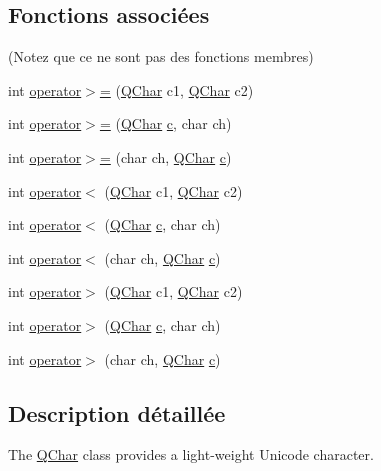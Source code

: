 \subsection*{Fonctions associées}
(Notez que ce ne sont pas des fonctions membres) \begin{DoxyCompactItemize}
\item 
int \hyperlink{class_q_char_a4b5fd192cc790217e8be92350c712f96}{operator$>$=} (\hyperlink{class_q_char}{Q\+Char} c1, \hyperlink{class_q_char}{Q\+Char} c2)
\item 
int \hyperlink{class_q_char_a76a11bfd8c91c16da6b67111e0f425f5}{operator$>$=} (\hyperlink{class_q_char}{Q\+Char} \hyperlink{060__command__switch_8tcl_ab14f56bc3bd7680490ece4ad7815465f}{c}, char ch)
\item 
int \hyperlink{class_q_char_acaf747a14f95126f00a60b1e25826449}{operator$>$=} (char ch, \hyperlink{class_q_char}{Q\+Char} \hyperlink{060__command__switch_8tcl_ab14f56bc3bd7680490ece4ad7815465f}{c})
\item 
int \hyperlink{class_q_char_a15002b2e206a26c172b93257b8502dd5}{operator$<$} (\hyperlink{class_q_char}{Q\+Char} c1, \hyperlink{class_q_char}{Q\+Char} c2)
\item 
int \hyperlink{class_q_char_a71f5a053f96ceccb5a6cbeb88a164235}{operator$<$} (\hyperlink{class_q_char}{Q\+Char} \hyperlink{060__command__switch_8tcl_ab14f56bc3bd7680490ece4ad7815465f}{c}, char ch)
\item 
int \hyperlink{class_q_char_a1337fd200b0e581e8ac7f54460bbbc39}{operator$<$} (char ch, \hyperlink{class_q_char}{Q\+Char} \hyperlink{060__command__switch_8tcl_ab14f56bc3bd7680490ece4ad7815465f}{c})
\item 
int \hyperlink{class_q_char_abc2415ff906b00a6fd8fda1587a5a8de}{operator$>$} (\hyperlink{class_q_char}{Q\+Char} c1, \hyperlink{class_q_char}{Q\+Char} c2)
\item 
int \hyperlink{class_q_char_a4c094bd4eb0c8476013d9c453278e66a}{operator$>$} (\hyperlink{class_q_char}{Q\+Char} \hyperlink{060__command__switch_8tcl_ab14f56bc3bd7680490ece4ad7815465f}{c}, char ch)
\item 
int \hyperlink{class_q_char_a73c1424f57eae2e721b34e5e242fa39d}{operator$>$} (char ch, \hyperlink{class_q_char}{Q\+Char} \hyperlink{060__command__switch_8tcl_ab14f56bc3bd7680490ece4ad7815465f}{c})
\end{DoxyCompactItemize}


\subsection{Description détaillée}
The \hyperlink{class_q_char}{Q\+Char} class provides a light-\/weight Unicode character. 

